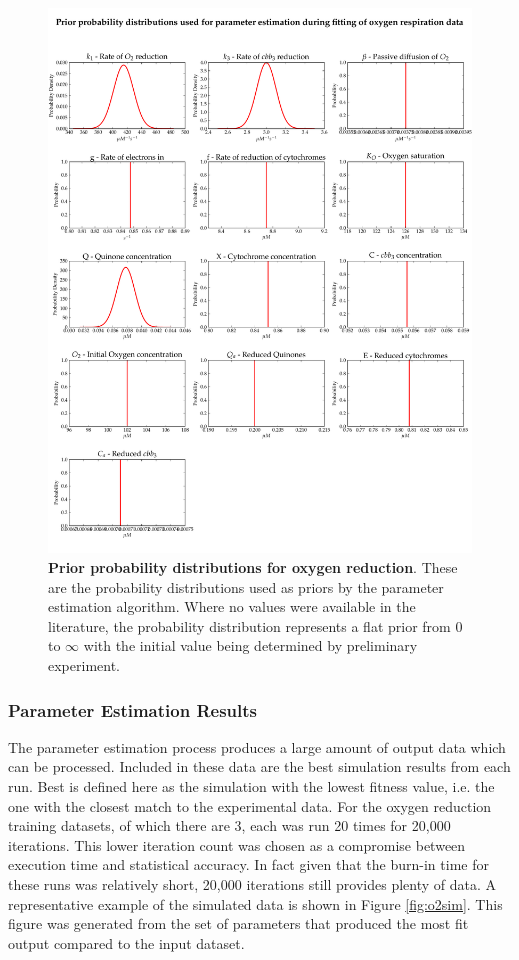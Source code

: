 \begin{figure}[tbp]
 \centering
 \includegraphics[width=15cm]{./05-oxygenreduction/data/priors.pdf}
 \caption[Prior probability distributions for oxygen reduction]{{\bf Prior probability distributions for oxygen reduction}. These are the probability distributions used as priors by the parameter estimation algorithm. Where no values were available in the literature, the probability distribution represents a flat prior from 0 to $\infty$ with the initial value being determined by preliminary experiment.
 \label{fig:oxypriors}}
\end{figure}

\subsubsection{Parameter Estimation Results}
The parameter estimation process produces a large amount of output data which can be processed. Included in these data are the best simulation results from each run. Best is defined here as the simulation with the lowest fitness value, i.e. the one with the closest match to the experimental data. For the oxygen reduction training datasets, of which there are 3, each was run 20 times for 20,000 iterations. This lower iteration count was chosen as a compromise between execution time and statistical accuracy. In fact given that the burn-in time for these runs was relatively short, 20,000 iterations still provides plenty of data. A representative example of the simulated data is shown in Figure \ref{fig:o2sim}. This figure was generated from the set of parameters that produced the most fit output compared to the input dataset.

